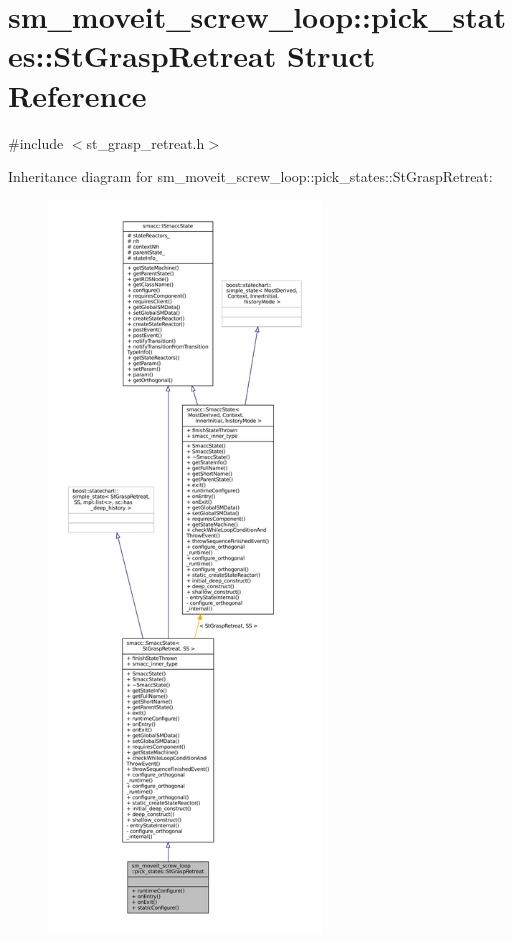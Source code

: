 \hypertarget{structsm__moveit__screw__loop_1_1pick__states_1_1StGraspRetreat}{}\section{sm\+\_\+moveit\+\_\+screw\+\_\+loop\+:\+:pick\+\_\+states\+:\+:St\+Grasp\+Retreat Struct Reference}
\label{structsm__moveit__screw__loop_1_1pick__states_1_1StGraspRetreat}


{\ttfamily \#include $<$st\+\_\+grasp\+\_\+retreat.\+h$>$}



Inheritance diagram for sm\+\_\+moveit\+\_\+screw\+\_\+loop\+:\+:pick\+\_\+states\+:\+:St\+Grasp\+Retreat\+:
\nopagebreak
\begin{figure}[H]
\begin{center}
\leavevmode
\includegraphics[height=550pt]{structsm__moveit__screw__loop_1_1pick__states_1_1StGraspRetreat__inherit__graph}
\end{center}
\end{figure}


